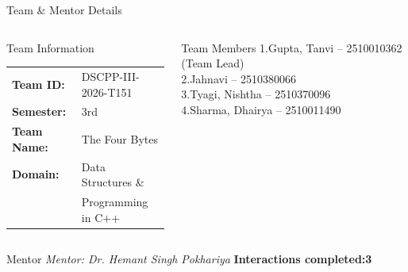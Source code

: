 \documentclass[aspectratio=169,11pt]{beamer}
\newcommand{\placeholder}[1]{\textit{\color{GEUGrey}#1}}
\begin{document}
\begin{frame}{Team \& Mentor Details}

\begin{columns}[T,totalwidth=\textwidth]


\begin{block}{Team Information}
\begin{tabular}{@{}p{2.5cm}p{4.2cm}@{}}
\textbf{Team ID:} & DSCPP-III-2026-T151\\
\textbf{Semester:} & 3rd\\
\textbf{Team Name:} & The Four Bytes\\
\textbf{Domain:} & Data Structures \&\\
& Programming in C++
\end{tabular}
\end{block}



\begin{block}{Team Members}
1.\quad Gupta, Tanvi -- 2510010362 (Team Lead)\\
2.\quad Jahnavi -- 2510380066\\
3.\quad Tyagi, Nishtha -- 2510370096\\
4.\quad Sharma, Dhairya -- 2510011490
\end{block}

\end{columns}

\vspace{2mm}

\begin{block}{Mentor}
\placeholder{Mentor: Dr. Hemant Singh Pokhariya}
\hfill
\textbf{Interactions completed:3}
\end{block}

\end{frame}
\end{document}
